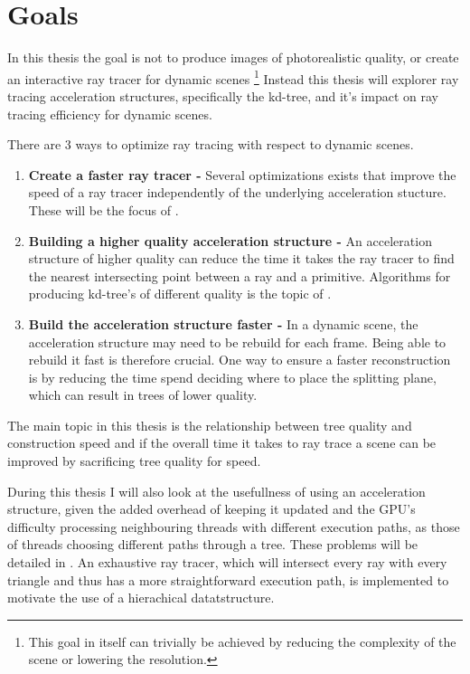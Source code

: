 \section{Goals}

In this thesis the goal is not to produce images of photorealistic
quality, or create an interactive ray tracer for dynamic
scenes \footnote{This goal in itself can trivially be achieved by
  reducing the complexity of the scene or lowering the resolution.}
Instead this thesis will explorer ray tracing acceleration structures,
specifically the kd-tree, and it's impact on ray tracing efficiency
for dynamic scenes.

There are 3 ways to optimize ray tracing with respect to dynamic
scenes. 

\begin{enumerate}
  \item \textbf{Create a faster ray tracer -} Several optimizations
    exists that improve the speed of a ray tracer independently of the
    underlying acceleration stucture. These will be the focus of
    .
  \item \textbf{Building a higher quality acceleration structure -} An
    acceleration structure of higher quality can reduce the time it
    takes the ray tracer to find the nearest intersecting point
    between a ray and a primitive. Algorithms for producing kd-tree's
    of different quality is the topic of
    .
  \item \textbf{Build the acceleration structure faster -} In a
    dynamic scene, the acceleration structure may need to be rebuild
    for each frame. Being able to rebuild it fast is therefore
    crucial. One way to ensure a faster reconstruction is by reducing
    the time spend deciding where to place the splitting plane, which
    can result in trees of lower quality.
\end{enumerate}

The main topic in this thesis is the relationship between tree quality
and construction speed and if the overall time it takes to ray trace a
scene can be improved by sacrificing tree quality for speed.

During this thesis I will also look at the usefullness of using an
acceleration structure, given the added overhead of keeping it updated
and the GPU's difficulty processing neighbouring threads with
different execution paths, as those of threads choosing different
paths through a tree. These problems will be detailed in
. An exhaustive ray tracer, which will
intersect every ray with every triangle and thus has a more
straightforward execution path, is implemented to motivate the use of
a hierachical datatstructure.


